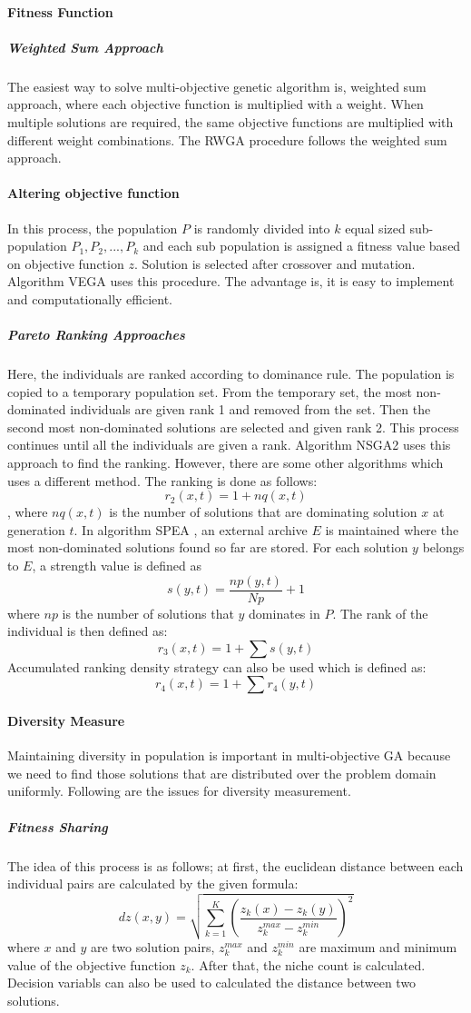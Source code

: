\paragraph {Fitness Function}
\subparagraph {Weighted Sum Approach}
The easiest way to solve multi-objective genetic algorithm is, weighted sum approach, where each objective function is multiplied with a weight. When multiple solutions are required, the same objective functions are multiplied with different weight combinations. The RWGA\cite{rwga} procedure follows the weighted sum approach.
\paragraph {Altering objective function}
In this process, the population $P$ is randomly divided into $k$ equal sized sub-population $P_1, P_2,..., P_k$ and each sub population is assigned a fitness value based on objective function $z$. Solution is selected after crossover and mutation. Algorithm VEGA \cite{vega} uses this procedure. The advantage is, it is easy to implement and computationally efficient. 
\subparagraph {Pareto Ranking Approaches}
Here, the individuals are ranked according to dominance rule. The population is copied to a temporary population set. From the temporary set, the most non-dominated individuals are given rank 1 and removed from the set. Then the second most non-dominated solutions are selected and given rank 2. This process continues until all the individuals are given a rank. Algorithm NSGA2\cite{nsga2} uses this approach to find the ranking. However, there are some other algorithms which uses a different method. The ranking is done as follows: \[r_2(x,t)=1+nq(x,t)\], where $nq(x,t)$ is the number of solutions that are dominating solution $x$ at generation $t$. In algorithm SPEA \cite{spea}, an external archive $E$ is maintained where the most non-dominated solutions found so far are stored. For each solution $y$ belongs to $E$, a strength value is defined as \[s(y,t)= \frac {np(y,t)}{Np} +1\] where $np$ is the number of solutions that $y$ dominates in $P$. The rank of the individual is then defined as: \[r_3(x,t)=1+\sum s(y,t)\] Accumulated ranking density strategy can also be used which is defined as: \[r_4(x,t)=1+ \sum r_4(y,t)\]

\paragraph {Diversity Measure}
Maintaining diversity in population is important in multi-objective GA because we need to find those solutions that are distributed over the problem domain uniformly. Following are the issues for diversity measurement.
\subparagraph {Fitness Sharing}
The idea of this process is as follows; at first, the euclidean distance between each individual pairs are calculated by the given formula: \[dz(x,y) = \sqrt {\sum\limits_{k=1}^K {(\frac {z_k(x) - z_k(y)} {z_k^{max} - z_k^{min}})}^2}\]
where $x$ and $y$ are two solution pairs, $z_k^{max}$ and $z_k^{min}$  are maximum and minimum value of the objective function $z_k$. After that, the niche count is calculated. Decision variabls can also be used to calculated the distance between two solutions.

